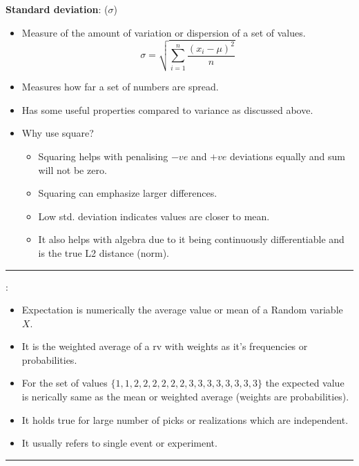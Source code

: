 \documentclass[	DIV=calc,%
paper=a4,%
fontsize=11pt,%
twocolumn]{scrartcl} %
\newcommand{\hformbar}[1]{\vspace{5pt}\hrule\vspace{10pt}} %
\newcommand{\formdesc}[1]{\noindent\textbf{#1}}
\begin{document}
\formdesc{Standard deviation}: ($\sigma$)
\begin{itemize}
	\item Measure of the amount of variation or dispersion of a set of values.
		\begin{equation}
			\sigma = \sqrt{\sum_{i=1}^{n}\dfrac{(x_i-\mu)^2}{n}}
		\end{equation}
	\item  Measures how far a set of numbers are spread.
	\item Has some useful properties compared to variance as discussed above.
	\item Why use square?
	\begin{itemize}
		\item Squaring helps with penalising $-ve$ and $+ve$ deviations equally and sum will not be zero.
		\item Squaring can emphasize larger differences.
		\item Low std. deviation indicates values are closer to mean.
		\item It also helps with algebra due to it being continuously differentiable and is the true L2 distance (norm).
	\end{itemize}
\end{itemize}

\hformbar

\formdesc{Expected value (or) Expectation}:

\begin{itemize}
	\item Expectation is numerically the average value or mean of a Random variable $X$.
	\item It is the weighted average of a rv with weights as it's frequencies or probabilities.
	\item For the set of values $\{1,1,2,2,2,2,2,2,3,3,3,3,3,3,3,3\}$ the expected value is nerically same as the mean or weighted average (weights are probabilities).
	\item It holds true for large number of picks or realizations which are independent.
	\item It usually refers to single event or experiment.
\end{itemize}

\hformbar

\newpage
\end{document}
